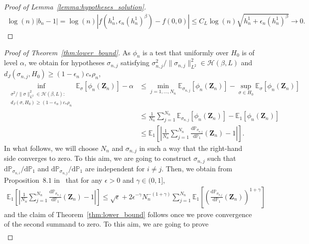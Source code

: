 \documentclass[10.5pt,letter]{article}
\numberwithin{equation}{section}
\theoremstyle{definition}
\newcommand{\E}{\mathbb{E}}
\renewcommand{\P}{\mathbb{P}}
\newcommand{\1}{\mathbbm{1}}
\begin{document}
\begin{proof}[Proof of Lemma~\ref{lemma:hypotheses_solution}]
    \begin{align*}
        \log(n) \left| b_n-1\right| = \log(n)\left| f(h_n^1, \epsilon_n(h_n^1)^\beta) - f(0,0)\right| \leq C_L\log(n)\sqrt{ h_n^1 + \epsilon_n(h_n^1)^\beta} \rightarrow 0.
    \end{align*}
\end{proof}




\begin{proof}[Proof of Theorem~\ref{thm:lower_bound}]
As $\phi_n$ is a test that uniformly over $H_0$ is of level $\alpha$, we obtain for hypotheses $\sigma_{n,j}$ satisfying $\sigma_{n,j}^2/\|\sigma_{n,j}\|_{L^2}^2\in\mathcal{H}(\beta,L)$ and $d_J(\sigma_{n,j},H_0) \geq (1-\epsilon_n)c_*\rho_n$, 
\begin{align*}
\inf_{ \substack{\sigma^2/\|\sigma\|_{L^2}^2\in\mathcal{H}(\beta,L):\\ d_J(\sigma, H_0)\geq (1-\epsilon_n)c_*\rho_n}} \E_\sigma[\phi_n(\mathbf{Z}_n)] - \alpha 
& \leq \min_{j=1,\dots, N_n} \E_{\sigma_{n,j}}[\phi_n(\mathbf{Z}_n)] - \sup_{\sigma\in H_0} \E_\sigma[\phi_n(\mathbf{Z}_n)] \\
& \leq \frac{1}{N_n} \sum_{j=1}^{N_n} \E_{\sigma_{n,j}}[\phi_n(\mathbf{Z}_n)] - \E_1[\phi_n(\mathbf{Z}_n)] \\
& \leq \E_1 \left[ \left| \frac{1}{N_n} \sum_{j=1}^{N_n} \frac{\textrm{d}\P_{\sigma_{n,j}}}{\textrm{d}\P_1}(\mathbf{Z}_n)  -1\right|\right].
\end{align*}
In what follows, we will choose $N_n$ and $\sigma_{n,j}$ in such a way that the right-hand side converges to zero. To this aim, we are going to construct $\sigma_{n,j}$ such that $\textrm{d}\P_{\sigma_{n,i}}/\textrm{d}\P_1$ and $\textrm{d}\P_{\sigma_{n,j}}/\textrm{d}\P_1$ are independent for $i\neq j$. Then, we obtain from Proposition~$8.1$ in~\cite{Brutsche/Rohde} that for any $\epsilon>0$ and $\gamma\in (0,1]$,
\begin{align*}
    \E_1 \left[ \left| \frac{1}{N_n} \sum_{j=1}^{N_n} \frac{\textrm{d}\P_{\sigma_{n,j}}}{\textrm{d}\P_1}(\mathbf{Z}_n)  -1\right|\right] \leq \sqrt{\epsilon} + 2\epsilon^{-\gamma} N_n^{-(1+\gamma)} \sum_{j=1}^{N_n}\E_1 \left[\left(\frac{\textrm{d}\P_{\sigma_{n,j}}}{\textrm{d}\P_1}(\mathbf{Z}_n)\right)^{1+\gamma}\right]
\end{align*}   
and the claim of Theorem~\ref{thm:lower_bound} follows once we prove convergence of the second summand to zero. To this aim, we are going to prove
\begin{align}\label{eq_proof:lower3}

\end{align}
\end{proof}
\end{document}
